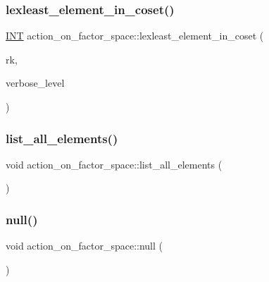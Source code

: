 \subsubsection{\texorpdfstring{lexleast\+\_\+element\+\_\+in\+\_\+coset()}{lexleast\_element\_in\_coset()}}
{\footnotesize\ttfamily \mbox{\hyperlink{galois_8h_a09fddde158a3a20bd2dcadb609de11dc}{I\+NT}} action\+\_\+on\+\_\+factor\+\_\+space\+::lexleast\+\_\+element\+\_\+in\+\_\+coset (\begin{DoxyParamCaption}\item[{\mbox{\hyperlink{galois_8h_a09fddde158a3a20bd2dcadb609de11dc}{I\+NT}}}]{rk,  }\item[{\mbox{\hyperlink{galois_8h_a09fddde158a3a20bd2dcadb609de11dc}{I\+NT}}}]{verbose\+\_\+level }\end{DoxyParamCaption})}

\mbox{\label{classaction__on__factor__space_a9ed3bf2d32594600a1e6f39837236202}} 
\subsubsection{\texorpdfstring{list\+\_\+all\+\_\+elements()}{list\_all\_elements()}}
{\footnotesize\ttfamily void action\+\_\+on\+\_\+factor\+\_\+space\+::list\+\_\+all\+\_\+elements (\begin{DoxyParamCaption}{ }\end{DoxyParamCaption})}

\mbox{\label{classaction__on__factor__space_ae035ff0be77d183b88c99886de965038}} 
\subsubsection{\texorpdfstring{null()}{null()}}
{\footnotesize\ttfamily void action\+\_\+on\+\_\+factor\+\_\+space\+::null (\begin{DoxyParamCaption}{ }\end{DoxyParamCaption})}

